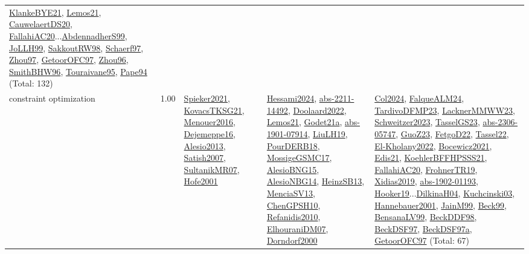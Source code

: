 {\begin{longtable}{p{3cm}r>{\raggedright\arraybackslash}p{6cm}>{\raggedright\arraybackslash}p{6cm}>{\raggedright\arraybackslash}p{8cm}}
\hyperref[detail:KlankeBYE21]{KlankeBYE21}, \hyperref[detail:Lemos21]{Lemos21}, \hyperref[detail:CauwelaertDS20]{CauwelaertDS20}, \hyperref[detail:FallahiAC20]{FallahiAC20}...\hyperref[detail:AbdennadherS99]{AbdennadherS99}, \hyperref[detail:JoLLH99]{JoLLH99}, \hyperref[detail:SakkoutRW98]{SakkoutRW98}, \hyperref[detail:Schaerf97]{Schaerf97}, \hyperref[detail:Zhou97]{Zhou97}, \hyperref[detail:GetoorOFC97]{GetoorOFC97}, \hyperref[detail:Zhou96]{Zhou96}, \hyperref[detail:SmithBHW96]{SmithBHW96}, \hyperref[detail:Touraivane95]{Touraivane95}, \hyperref[detail:Pape94]{Pape94} (Total: 132)\\
\index{constraint optimization}\index{CP!constraint optimization}constraint optimization &  1.00 & \hyperref[detail:Spieker2021]{Spieker2021}, \hyperref[detail:KovacsTKSG21]{KovacsTKSG21}, \hyperref[detail:Menouer2016]{Menouer2016}, \hyperref[detail:Dejemeppe16]{Dejemeppe16}, \hyperref[detail:Alesio2013]{Alesio2013}, \hyperref[detail:Satish2007]{Satish2007}, \hyperref[detail:SultanikMR07]{SultanikMR07}, \hyperref[detail:Hofe2001]{Hofe2001} & \hyperref[detail:Hessami2024]{Hessami2024}, \hyperref[detail:abs-2211-14492]{abs-2211-14492}, \hyperref[detail:Doolaard2022]{Doolaard2022}, \hyperref[detail:Lemos21]{Lemos21}, \hyperref[detail:Godet21a]{Godet21a}, \hyperref[detail:abs-1901-07914]{abs-1901-07914}, \hyperref[detail:LiuLH19]{LiuLH19}, \hyperref[detail:PourDERB18]{PourDERB18}, \hyperref[detail:MossigeGSMC17]{MossigeGSMC17}, \hyperref[detail:AlesioBNG15]{AlesioBNG15}, \hyperref[detail:AlesioNBG14]{AlesioNBG14}, \hyperref[detail:HeinzSB13]{HeinzSB13}, \hyperref[detail:MenciaSV13]{MenciaSV13}, \hyperref[detail:ChenGPSH10]{ChenGPSH10}, \hyperref[detail:Refanidis2010]{Refanidis2010}, \hyperref[detail:ElhouraniDM07]{ElhouraniDM07}, \hyperref[detail:Dorndorf2000]{Dorndorf2000} & \hyperref[detail:Col2024]{Col2024}, \hyperref[detail:FalqueALM24]{FalqueALM24}, \hyperref[detail:TardivoDFMP23]{TardivoDFMP23}, \hyperref[detail:LacknerMMWW23]{LacknerMMWW23}, \hyperref[detail:Schweitzer2023]{Schweitzer2023}, \hyperref[detail:TasselGS23]{TasselGS23}, \hyperref[detail:abs-2306-05747]{abs-2306-05747}, \hyperref[detail:GuoZ23]{GuoZ23}, \hyperref[detail:FetgoD22]{FetgoD22}, \hyperref[detail:Tassel22]{Tassel22}, \hyperref[detail:El-Kholany2022]{El-Kholany2022}, \hyperref[detail:Bocewicz2021]{Bocewicz2021}, \hyperref[detail:Edis21]{Edis21}, \hyperref[detail:KoehlerBFFHPSSS21]{KoehlerBFFHPSSS21}, \hyperref[detail:FallahiAC20]{FallahiAC20}, \hyperref[detail:FrohnerTR19]{FrohnerTR19}, \hyperref[detail:Xidias2019]{Xidias2019}, \hyperref[detail:abs-1902-01193]{abs-1902-01193}, \hyperref[detail:Hooker19]{Hooker19}...\hyperref[detail:DilkinaH04]{DilkinaH04}, \hyperref[detail:Kuchcinski03]{Kuchcinski03}, \hyperref[detail:Hannebauer2001]{Hannebauer2001}, \hyperref[detail:JainM99]{JainM99}, \hyperref[detail:Beck99]{Beck99}, \hyperref[detail:BensanaLV99]{BensanaLV99}, \hyperref[detail:BeckDDF98]{BeckDDF98}, \hyperref[detail:BeckDSF97]{BeckDSF97}, \hyperref[detail:BeckDSF97a]{BeckDSF97a}, \hyperref[detail:GetoorOFC97]{GetoorOFC97} (Total: 67)\\

\end{longtable}}
